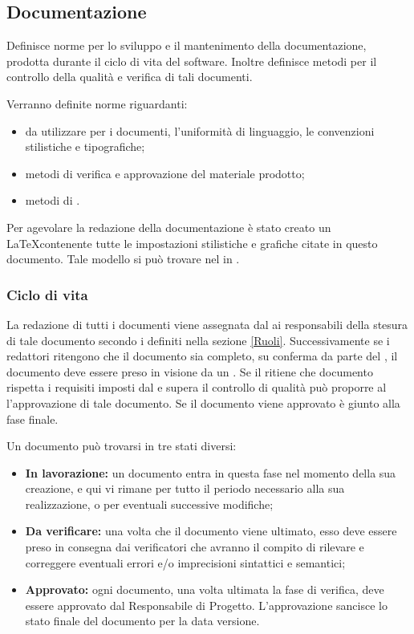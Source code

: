 \documentclass[12pt,a4paper]{article}
\begin{document}
\subsection{Documentazione}\label{Documentazione}
Definisce norme per lo sviluppo e il mantenimento della documentazione, prodotta durante il ciclo di vita del software. Inoltre definisce metodi per il controllo della qualità e verifica di tali documenti.

Verranno definite norme riguardanti:
\begin{itemize}
	\item {} da utilizzare per i documenti, l'uniformità di linguaggio, le convenzioni stilistiche e tipografiche;
	\item metodi di verifica e approvazione del materiale prodotto;
	\item metodi di .
\end{itemize}

Per agevolare la redazione della documentazione è stato creato un  \LaTeX contenente tutte le impostazioni stilistiche e grafiche citate in questo documento. Tale modello si può trovare nel  in .

\subsubsection{Ciclo di vita}

La redazione di tutti i documenti viene assegnata dal \PM{} ai responsabili della stesura di tale documento secondo i  definiti nella sezione \ref{Ruoli}. Successivamente se i redattori ritengono che il documento sia completo, su conferma da parte del \PM, il documento deve essere preso in visione da un \VR. Se il \VR{} ritiene che documento rispetta i requisiti imposti dal \PR{} e supera il controllo di qualità può proporre al \PM{} l'approvazione di tale documento. Se il documento viene approvato è giunto alla fase finale.

Un documento può trovarsi in tre stati diversi:
\begin{itemize}
	\item \textbf{In lavorazione:} un documento entra in questa fase nel momento della sua creazione, e qui vi rimane per tutto il periodo necessario alla sua realizzazione, o per eventuali successive modifiche;
	\item \textbf{Da verificare:} una volta che il documento viene ultimato, esso deve essere preso in consegna dai verificatori che avranno il compito di rilevare e correggere eventuali errori e/o imprecisioni sintattici e semantici;
	\item \textbf{Approvato:} ogni documento, una volta ultimata la fase di verifica, deve essere approvato dal Responsabile di Progetto. L’approvazione sancisce lo stato finale del documento per la data versione.
\end{itemize}
\end{document}
